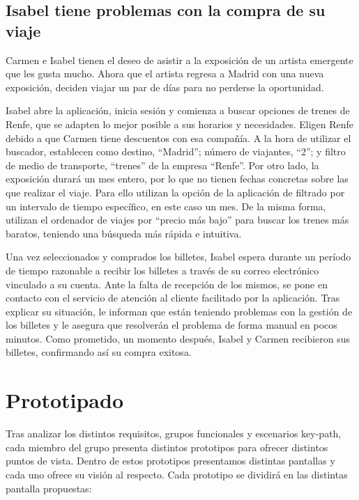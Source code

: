 \subsection{Isabel tiene problemas con la compra de su viaje}

Carmen e Isabel tienen el deseo de asistir a la exposición de un artista emergente que les gusta mucho. Ahora que el artista regresa a Madrid con una nueva exposición, deciden viajar un par de días para no perderse la oportunidad.

Isabel abre la aplicación, inicia sesión y comienza a buscar opciones de trenes de Renfe, que se adapten lo mejor posible a sus horarios y necesidades. Eligen Renfe debido a que Carmen tiene descuentos con esa compañía. A la hora de utilizar el buscador, establecen como destino, “Madrid”; número de viajantes, “2”; y filtro de medio de transporte, “trenes” de la empresa “Renfe”. 
Por otro lado, la exposición durará un mes entero, por lo que no tienen fechas concretas sobre las que realizar el viaje. Para ello utilizan la opción de la aplicación de filtrado por un intervalo de tiempo específico, en este caso un mes. De la misma forma, utilizan el ordenador de viajes por “precio más bajo” para buscar los trenes más baratos, teniendo una búsqueda más rápida e intuitiva.

Una vez seleccionados y comprados los billetes, Isabel espera durante un período de tiempo razonable a recibir los billetes a través de su correo electrónico vinculado a su cuenta. Ante la falta de recepción de los mismos, se pone en contacto con el servicio de atención al cliente facilitado por la aplicación. Tras explicar su situación, le informan que están teniendo problemas con la gestión de los billetes y le asegura que resolverán el problema de forma manual en pocos minutos. 
Como prometido, un momento después, Isabel y Carmen recibieron sus billetes, confirmando así su compra exitosa.

\section{Prototipado}

Tras analizar los distintos requisitos, grupos funcionales y escenarios key-path, cada miembro del grupo presenta distintos prototipos para ofrecer distintos puntos de vista. Dentro de estos prototipos presentamos distintas pantallas y cada uno ofrece su visión al respecto. Cada prototipo se dividirá en las distintas pantalla propuestas:

